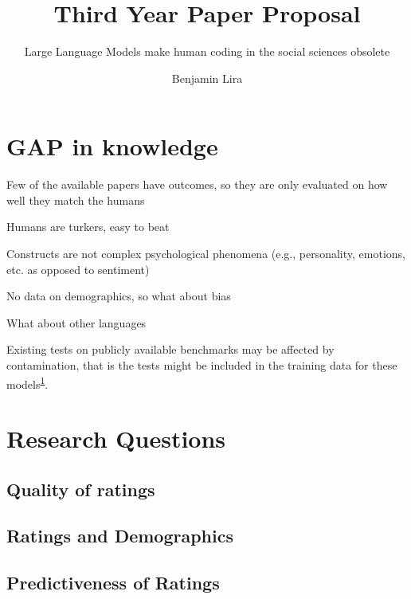\documentclass[
  10pt,
  letterpaper,
  DIV=11,
  numbers=noendperiod]{scrartcl}
\title{Third Year Paper Proposal}
\subtitle{Large Language Models make human coding in the social sciences
obsolete}
\author{Benjamin Lira}
\date{}
\begin{document}
\maketitle
\ifdefined\Shaded\renewenvironment{Shaded}{\begin{tcolorbox}[interior hidden, breakable, enhanced, borderline west={3pt}{0pt}{shadecolor}, boxrule=0pt, sharp corners, frame hidden]}{\end{tcolorbox}}\fi

\hypertarget{gap-in-knowledge}{%
\section{GAP in knowledge}\label{gap-in-knowledge}}

Few of the available papers have outcomes, so they are only evaluated on
how well they match the humans

Humans are turkers, easy to beat

Constructs are not complex psychological phenomena (e.g., personality,
emotions, etc. as opposed to sentiment)

No data on demographics, so what about bias

What about other languages

Existing tests on publicly available benchmarks may be affected by
contamination, that is the tests might be included in the training data
for these models\textsuperscript{\protect\hyperlink{ref-pangakis}{1}}.

\hypertarget{research-questions}{%
\section{Research Questions}\label{research-questions}}

\hypertarget{quality-of-ratings}{%
\subsection{Quality of ratings}\label{quality-of-ratings}}

\hypertarget{ratings-and-demographics}{%
\subsection{Ratings and Demographics}\label{ratings-and-demographics}}

\hypertarget{predictiveness-of-ratings}{%
\subsection{Predictiveness of Ratings}\label{predictiveness-of-ratings}}
\end{document}
